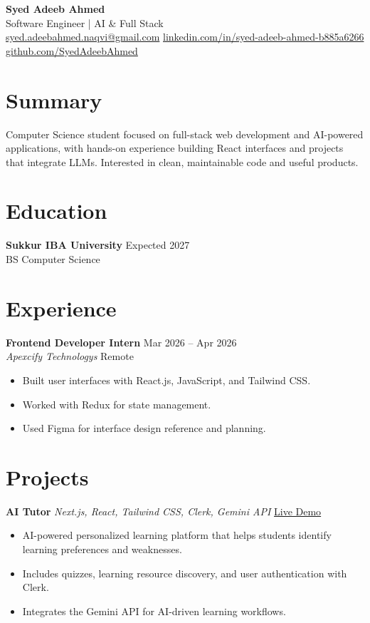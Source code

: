 \documentclass[10.5pt,letterpaper]{article}
\begin{document}
\begin{center}
{\LARGE\bfseries Syed Adeeb Ahmed}\\[3pt]
Software Engineer | AI \& Full Stack\\[2pt]
\href{mailto:syed.adeebahmed.naqvi@gmail.com}{syed.adeebahmed.naqvi@gmail.com} \textbar{} \href{https://www.linkedin.com/in/syed-adeeb-ahmed-b885a6266/}{linkedin.com/in/syed-adeeb-ahmed-b885a6266} \textbar{} \href{https://github.com/SyedAdeebAhmed}{github.com/SyedAdeebAhmed}
\end{center}

\section*{Summary}
Computer Science student focused on full-stack web development and AI-powered applications, with hands-on experience building React interfaces and projects that integrate LLMs. Interested in clean, maintainable code and useful products.

\section*{Education}
\textbf{Sukkur IBA University} \hfill Expected 2027\\
BS Computer Science

\section*{Experience}
\textbf{Frontend Developer Intern} \hfill Mar 2026 -- Apr 2026\\
\textit{Apexcify Technologys} \hfill Remote
\begin{itemize}
\item Built user interfaces with React.js, JavaScript, and Tailwind CSS.
\item Worked with Redux for state management.
\item Used Figma for interface design reference and planning.
\end{itemize}

\section*{Projects}
\textbf{AI Tutor} \textbar{} \textit{Next.js, React, Tailwind CSS, Clerk, Gemini API} \hfill \href{https://ai-tutor-h7b1.vercel.app/}{Live Demo}
\begin{itemize}
\item AI-powered personalized learning platform that helps students identify learning preferences and weaknesses.
\item Includes quizzes, learning resource discovery, and user authentication with Clerk.
\item Integrates the Gemini API for AI-driven learning workflows.
\end{itemize}
\end{document}
